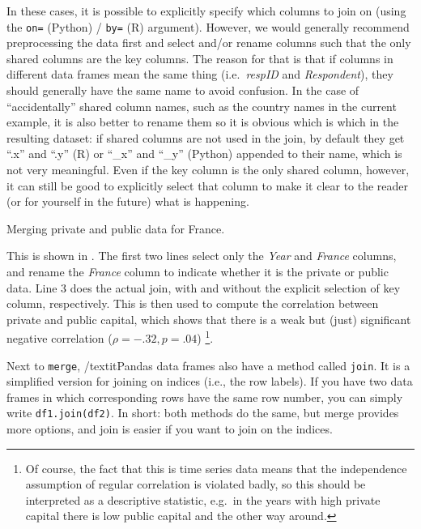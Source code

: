 In these cases, it is possible to explicitly specify which columns to join on (using the \verb+on=+ (Python) / \verb+by=+ (R) argument).
However, we would generally recommend preprocessing the data first and select and/or rename columns such that the only shared columns are the key columns.
The reason for that is that if columns in different data frames mean the same thing (i.e.\ \emph{respID} and \emph{Respondent}), they should generally have the same name to avoid confusion.
In the case of ``accidentally'' shared column names, such as the country names in the current example,
it is also better to rename them so it is obvious which is which in the resulting dataset:
if shared columns are not used in the join, by default they get ``.x'' and ``.y'' (R) or ``\_x'' and ``\_y'' (Python) appended to their name, which is not very meaningful.
Even if the key column is the only shared column, however, it can still be good to explicitly select that column to make it clear to the reader (or for yourself in the future) what is happening.

\begin{ccsexample}
\caption{Merging private and public data for France.}\label{ex:merge}
\end{ccsexample}

This is shown in .
The first two lines select only the \emph{Year} and \emph{France} columns, and rename the \emph{France} column to indicate whether it is the private or public data.
Line 3 does the actual join, with and without the explicit selection of key column, respectively.
This is then used to compute the correlation between private and public capital,
which shows that there is a weak but (just) significant negative correlation ($\rho=-.32, p=.04$)%
\footnote{Of course, the fact that this is time series data means that the independence assumption of regular correlation is violated badly, so this should be interpreted as a descriptive statistic, e.g.\ in the years with high private capital there is low public capital and the other way around.}.

\begin{feature}
  Next to \texttt{merge}, /textit{Pandas} data frames also have a method called \texttt{join}. It is a simplified version for joining on indices (i.e., the row labels). If you have two data frames in which corresponding rows have the same row number, you can simply write \texttt{df1.join(df2)}. In short: both methods do the same, but merge provides more options, and join is easier if you want to join on the indices.
\end{feature}



